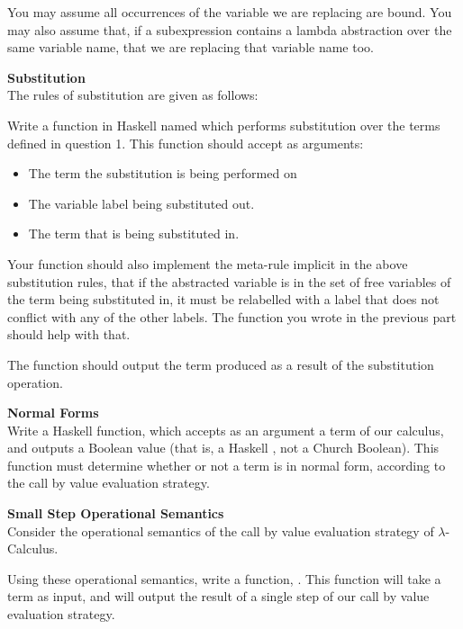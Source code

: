 \documentclass{exam}
\let\OldTexttt\texttt
\renewcommand{\texttt}[1]{\OldTexttt{\color{teal}{#1}}}
\begin{document}
\begin{questions}
You may assume all occurrences of the variable we are replacing are bound.  You may also assume that, if a subexpression contains a lambda abstraction over the same variable name, that we are replacing that variable name too.

\question[10] \textbf{Substitution} \\ 
The rules of substitution are given as follows:

\texttt{[image: figures/Substitution.png]}

Write a function in Haskell named \texttt{sub} which performs substitution over the terms defined in question 1.  This function should accept as arguments:
\begin{itemize}
\item The term the substitution is being performed on
\item The variable label being substituted out.
\item The term that is being substituted in.
\end{itemize}

Your function should also implement the meta-rule implicit in the above substitution rules, that if the abstracted variable is in the set of free variables of the term being substituted in, it must be relabelled with a label that does not conflict with any of the other labels.  The function you wrote in the previous part should help with that.  

The function should output the term produced as a result of the substitution operation. 

\question[5] \textbf{Normal Forms} \\
Write a Haskell function, \texttt{isNF} which accepts as an argument a term of our calculus, and outputs a Boolean value (that is, a Haskell \texttt{Bool}, not a Church Boolean).  This function must determine whether or not a term is in normal form, according to the call by value evaluation strategy.  

\question[5] \textbf{Small Step Operational Semantics} \\
Consider the operational semantics of the call by value evaluation strategy of $\lambda$-Calculus.   

\texttt{[image: figures/ssos.png]}

Using these operational semantics, write a function, \texttt{ssos}.  This function will take a term as input, and will output the result of a single step of our call by value evaluation strategy. 


\end{questions}
\end{document}
